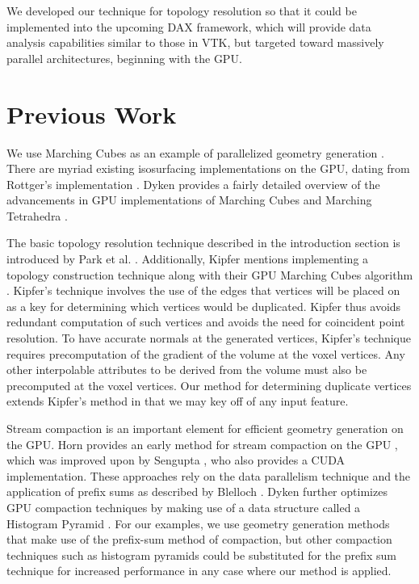 \documentclass[review,journal]{vgtc}         %
\begin{document}
We developed our technique for topology resolution so that it could be implemented
into the upcoming DAX framework, which will provide data analysis capabilities similar to those
in VTK, but targeted toward massively parallel architectures, beginning with the GPU.

\section{Previous Work}

We use Marching Cubes as an example of parallelized geometry 
generation \cite{Lorensen1987}. There are myriad existing isosurfacing implementations on the GPU, dating from 
Rottger's implementation \cite{Rottger2000}. Dyken provides a fairly 
detailed overview of the advancements in GPU implementations of Marching Cubes and 
Marching Tetrahedra \cite{Dyken2008} .

The basic topology resolution technique described in the introduction section is
introduced by Park et al. \cite{Park}. Additionally, Kipfer mentions
implementing a topology construction technique along with their GPU
Marching Cubes algorithm \cite{Kipfer2005}. Kipfer's technique involves the use of the edges that vertices 
will be placed on as a key for determining which vertices would be duplicated. Kipfer 
thus avoids redundant computation of such vertices and avoids the need for coincident 
point resolution. To have accurate normals at the generated vertices, Kipfer's technique
requires precomputation of the gradient of the volume at the voxel vertices. Any other
interpolable attributes to be derived from the volume must also be precomputed at the
voxel vertices. Our method for determining duplicate vertices extends Kipfer's method in that
we may key off of any input feature.

Stream compaction is an important element for efficient geometry generation on the GPU.
Horn provides an early method for stream compaction on the GPU \cite{Horn2005}, which
was improved upon by Sengupta \cite{Sengupta2007}, who also provides a CUDA implementation. 
These approaches rely on the data parallelism technique and the application of prefix sums 
as described by Blelloch \cite{Blelloch1990}. Dyken further optimizes
GPU compaction techniques by making use of a data structure called a Histogram Pyramid \cite{Dyken2008}.
For our examples, we use geometry generation methods that make use of the prefix-sum
method of compaction, but other compaction techniques such as histogram pyramids could be
substituted for the prefix sum technique for increased performance in any case where our method is applied.
\end{document}
